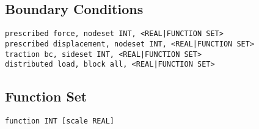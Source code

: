 \documentclass[10pt]{article}
\begin{document}
\subsection{Boundary Conditions}
\texttt{prescribed force, nodeset INT, <REAL|FUNCTION SET>} \\
\texttt{prescribed displacement, nodeset INT, <REAL|FUNCTION SET>} \\
\texttt{traction bc, sideset INT, <REAL|FUNCTION SET>} \\
\texttt{distributed load, block all, <REAL|FUNCTION SET>} \\

\subsection{Function Set}
\texttt{function INT [scale REAL]}



\printnomenclature[1.0in]
\end{document}
